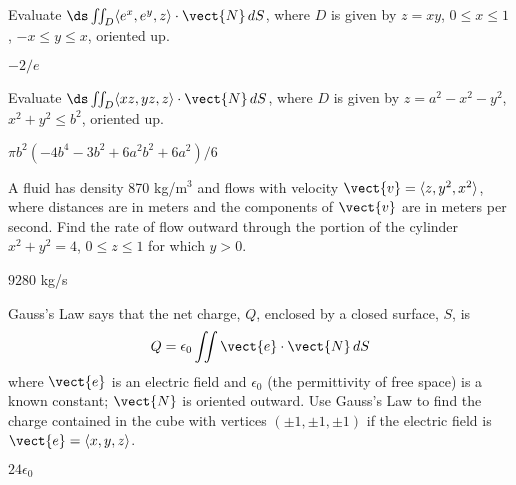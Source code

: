 \begin{enumialphparenastyle}
\begin{ex}
Evaluate $\ds \iint_{D} \langle e^x, e^y,z\rangle\cdot\vect{N}\,dS$, where $D$ is given by $z=xy$, $0\le x\le 1$, $-x\le
y\le x$, oriented up.
\begin{sol}
	$-2/e$
\end{sol}
\end{ex}

\begin{ex}
Evaluate $\ds \iint_{D} \langle xz,yz,z\rangle\cdot\vect{N}\,dS$, where $D$ is given by $z=a^2-x^2-y^2$, $x^2+y^2\le b^2$, 
oriented up.
\begin{sol}
	$\pi b^2(-4b^4-3b^2+6a^2b^2+6a^2)/6$
\end{sol}
\end{ex}

\begin{ex}
A fluid has density 870 kg/m$^3$ and flows with velocity $\vect{v} =
 \langle z,y^2,x^2\rangle$, where distances are in meters and the
 components of $\vect{v}$ are in meters per second.  Find the rate of flow
 outward through the portion of the cylinder $x^2+y^2 = 4$, $0\leq
 z\leq 1$ for which $y>0$.
\begin{sol}
	$9280$ kg/s
\end{sol}
\end{ex}

\begin{ex}
Gauss's Law says that the net charge, $Q$,
enclosed by a closed surface, $S$, is 
$$Q=\epsilon_0 \iint \vect{e}\cdot \vect{N}\,dS$$ 
where $\vect{e}$ is an electric field and $\epsilon_0$ (the
permittivity of free space) is a known constant; $\vect{N}$ is oriented
outward. 
Use Gauss's Law to find the charge contained in the cube with vertices
$(\pm 1, \pm 1, \pm 1)$ if the electric field is 
$\vect{e} = \langle x,y,z\rangle$.
\begin{sol}
	$24\epsilon_0$
\end{sol}
\end{ex}

\end{enumialphparenastyle}
